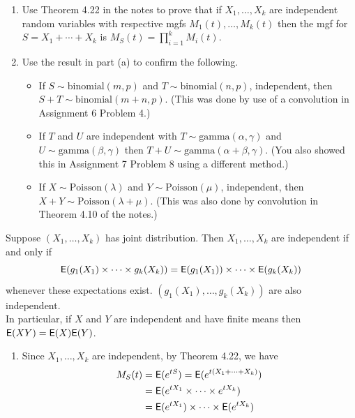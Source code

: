 \documentclass[12pt]{article}
\newcommand{\E}{{\sf E}}
\newenvironment{theorem}[2][Theorem]{\begin{trivlist}
\item[\hskip \labelsep {\bfseries #1}\hskip \labelsep {\bfseries #2.}]}
{\end{trivlist}}
\newenvironment{problem}[2][Problem]{\begin{trivlist}
\item[\hskip \labelsep {\bfseries #1}\hskip \labelsep {\bfseries #2.}]}
{\end{trivlist}}
\begin{document}
\begin{problem}{8}
  \begin{enumerate}
    \item Use Theorem 4.22 in the notes to prove that if $X_1, \ldots, X_k$ 
    are independent random variables with respective mgfs 
    $M_1(t), \ldots, M_k(t)$ then the mgf for $S = X_1 + \cdots + X_k$ is
    $M_S(t) = \prod_{i=1}^k M_i(t)$.
    \item Use the result in part (a) to confirm the following.
    \begin{itemize}
      \item[i.] If $S \sim \text{binomial}(m, p)$ and 
      $T \sim \text{binomial}(n, p)$, independent, then $S + T \sim
      \text{binomial}(m+n, p)$. (This was done by use of a convolution 
      in Assignment 6 Problem 4.)
      \item[ii.] If $T$ and $U$ are independent with 
      $T \sim \text{gamma}(\alpha, \gamma)$ and 
      $U \sim \text{gamma}(\beta, \gamma)$ then
      $T + U \sim \text{gamma}(\alpha + \beta, \gamma)$. 
      (You also showed this in Assignment 7 Problem 8 using
      a different method.)
      \item[iii.] If $X \sim \text{Poisson}(\lambda)$ and 
      $Y \sim \text{Poisson}(\mu)$, independent, then 
      $X + Y \sim \text{Poisson}(\lambda + \mu)$.
      (This was also done by convolution in Theorem 4.10 of the notes.)
    \end{itemize}
  \end{enumerate}
  \begin{theorem}{4.22}
    Suppose $(X_1, \ldots, X_k)$ has joint distribution. 
    Then $X_1, \ldots, X_k$ are independent if and only if
    \[
      \E(g_1(X_1) \times \cdots \times g_k(X_k)) = 
      \E(g_1(X_1)) \times \cdots \times \E(g_k(X_k))
    \]
    whenever these expectations exist. $(g_1(X_1), \ldots, g_k(X_k))$ 
    are also independent.\\
    In particular, if $X$ and $Y$ are independent
    and have finite means then $\E(XY) = \E(X) \E(Y)$.
  \end{theorem}
  \begin{enumerate}
    \item Since $X_1, \ldots, X_k$ are independent, by Theorem 4.22, we have
    \begin{align*}
      M_S(t) &= \E(e^{tS}) = \E(e^{t(X_1 + \cdots + X_k)}) \\
      &= \E(e^{tX_1} \times \cdots \times e^{tX_k}) \\
      &= \E(e^{tX_1}) \times \cdots \times \E(e^{tX_k}) \\

\end{align*}
\end{enumerate}
\end{problem}
\end{document}
